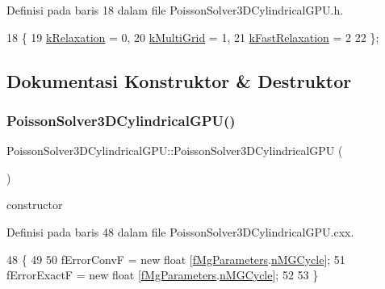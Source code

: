 Definisi pada baris 18 dalam file Poisson\+Solver3\+D\+Cylindrical\+G\+P\+U.\+h.


\begin{DoxyCode}
18                     \{
19     \hyperlink{classPoissonSolver3DCylindricalGPU_a5358c19436c2d27d2b917d070273e180af52763d2ca25e946b8aedc135297512c}{kRelaxation} = 0, 
20     \hyperlink{classPoissonSolver3DCylindricalGPU_a5358c19436c2d27d2b917d070273e180ab4c32d8aac8f42c5486b5f94649d64a4}{kMultiGrid} = 1,  
21     \hyperlink{classPoissonSolver3DCylindricalGPU_a5358c19436c2d27d2b917d070273e180ab7013b3a2eeeccf764d8df057642a493}{kFastRelaxation} = 2       
22   \};
\end{DoxyCode}


\subsection{Dokumentasi Konstruktor \& Destruktor}
\hypertarget{classPoissonSolver3DCylindricalGPU_a3c4108b642189cca05ad6715fde97457}{}\label{classPoissonSolver3DCylindricalGPU_a3c4108b642189cca05ad6715fde97457} 
\subsubsection{\texorpdfstring{Poisson\+Solver3\+D\+Cylindrical\+G\+P\+U()}{PoissonSolver3DCylindricalGPU()}}
{\footnotesize\ttfamily Poisson\+Solver3\+D\+Cylindrical\+G\+P\+U\+::\+Poisson\+Solver3\+D\+Cylindrical\+G\+PU (\begin{DoxyParamCaption}{ }\end{DoxyParamCaption})}

constructor 

Definisi pada baris 48 dalam file Poisson\+Solver3\+D\+Cylindrical\+G\+P\+U.\+cxx.


\begin{DoxyCode}
48                                                              \{
49 
50     fErrorConvF = \textcolor{keyword}{new} \textcolor{keywordtype}{float} [\hyperlink{classPoissonSolver3DCylindricalGPU_a0d5484e574537bc26978992b88573517}{fMgParameters}.\hyperlink{structPoissonSolver3DCylindricalGPU_1_1MGParameters_ab8c83ba4715a4bd71b30a27a07b87be9}{nMGCycle}];
51     fErrorExactF = \textcolor{keyword}{new} \textcolor{keywordtype}{float} [\hyperlink{classPoissonSolver3DCylindricalGPU_a0d5484e574537bc26978992b88573517}{fMgParameters}.\hyperlink{structPoissonSolver3DCylindricalGPU_1_1MGParameters_ab8c83ba4715a4bd71b30a27a07b87be9}{nMGCycle}];
52 
53 \}
\end{DoxyCode}


